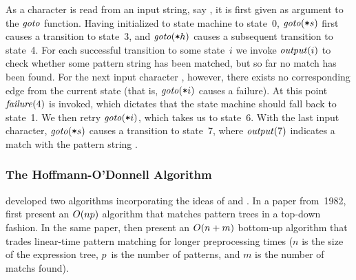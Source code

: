 %
As a character is read from an input string, say , it is first
given as argument to the $\textrm{\textit{goto}}$ function.
%
Having initialized to \gls{state machine} to state~\num{0},
$\textrm{\textit{goto}}(\mbox{\texttt{*}}{s})$ first causes a transition to state~\num{3}, and
$\textrm{\textit{goto}}(\mbox{\texttt{*}}{h})$ causes a subsequent transition to state~\num{4}.
%
For each successful transition to some state~$i$ we invoke
$\textrm{\textit{output}}(i)$ to check whether some \gls{pattern} string has been
matched, but so far no \gls{match} has been found.
%
For the next input character , however, there exists no corresponding
\gls{edge} from the current state (that is, $\textrm{\textit{goto}}(\mbox{\texttt{*}}{i})$ causes
a failure).
%
At this point $\textrm{\textit{failure}}(4)$ is invoked, which dictates that the
\gls{state machine} should fall back to state~\num{1}.
%
We then retry $\textrm{\textit{goto}}(\mbox{\texttt{*}}{i})$, which takes us to state~\num{6}.
%
With the last input character, $\textrm{\textit{goto}}(\mbox{\texttt{*}}{s})$ causes a transition
to state~\num{7}, where $\textrm{\textit{output}}(7)$ indicates a \gls{match} with the
\gls{pattern} string .


\subsubsection{The Hoffmann-O'Donnell Algorithm}

\textcite{HoffmannODonnell:1982} developed two algorithms incorporating the
ideas of \citeauthor{AhoCorasick:1975} and \citeauthor{KnuthEtAl:1977}.
%
In a paper from~1982, \citeauthor{HoffmannODonnell:1982} first present an
\mbox{$O(np)$} algorithm that matches \glspl{pattern tree} in a top-down
fashion.
%
In the same paper, \citeauthor{HoffmannODonnell:1982} then present an
\mbox{$O(n+m)$} bottom-up algorithm that trades linear-time \gls{pattern
  matching} for longer preprocessing times ($n$ is the size of the
\gls{expression tree}, $p$~is the number of \glspl{pattern}, and $m$ is the
number of \glspl{match} found).

